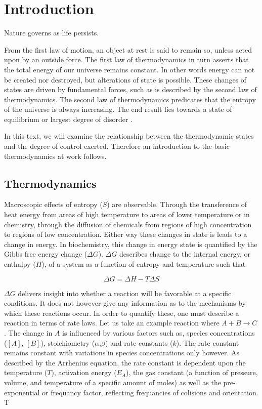 \chapter{Introduction}
\label{chp:1}
Nature governs as life persists. 

From the first law of motion, an object at rest is said to remain so, unless acted upon by an outside force. The first law of thermodynamics in turn asserts that the total energy of our universe remains constant. In other words energy can not be created nor destroyed, but alterations of state is possible. These changes of states are driven by fundamental forces, such as is described by the second law of thermodynamics. The second law of thermodynamics predicates that the entropy of the universe is always increasing. The end result lies towards a state of equilibrium or largest degree of disorder  \cite{Prigogine1998}. 

In this text, we will examine the relationship between the thermodynamic states and the degree of control exerted. Therefore an introduction to the basic thermodynamics at work follows.


\section{Thermodynamics}
Macroscopic effects of entropy ($S$) are observable. Through the transference of heat energy from areas of high temperature to areas of lower temperature or in chemistry, through the diffusion of chemicals from regions of high concentration to regions of low concentration. Either way these changes in state is leads to a change in energy. In biochemistry, this change in energy state is quantified by the Gibbs free energy change ($\Delta G$). $\Delta G$ describes change to the internal energy, or enthalpy ($H$), of a system  as a function of entropy and temperature such that 

\begin{equation}
\Delta G = \Delta H - T \Delta S  
\end{equation}

$\Delta G$ delivers insight into whether a reaction will be favorable at a specific conditions. It does not however give any information as to the mechanisms by which these reactions occur. In order to quantify these, one must describe a reaction in terms of rate laws. Let us take an example reaction where $A + B \longrightarrow C$. The change in $A$ is influenced by various factors such as, species concentrations ($[A]$, $[B]$), stoichiometry ($\alpha$,$\beta$) and rate constants ($k$). The rate constant remains constant with variations in species concentrations only however. As described by the Arrhenius equation, the rate constant is dependent upon the temperature ($T$), activation energy ($E_A$), the gas constant (a function of pressure, volume, and temperature of a specific amount of moles) as well as the pre-exponential or frequancy factor, reflecting frequancies of colisions and orientation. T

